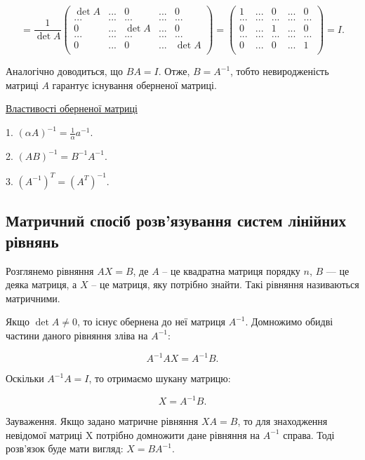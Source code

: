 $$= \dfrac{1}{\det A} \begin{pmatrix}
	\det A & ... & 0      & ... & 0      \\
	...    & ... & ...    & ... & ...    \\
	0      & ... & \det A & ... & 0      \\
	...    & ... & ...    & ... & ...    \\
	0      & ... & 0      & ... & \det A \\ 
\end{pmatrix}
= \begin{pmatrix}
	1      & ... & 0      & ... & 0      \\
	...    & ... & ...    & ... & ...    \\
	0      & ... & 1      & ... & 0      \\
	...    & ... & ...    & ... & ...    \\
	0      & ... & 0      & ... & 1      \\ 
\end{pmatrix}
= I.$$


Аналогічно доводиться, що $B A = I$. Отже, $B = A^{-1}$, тобто невиродженість
матриці $A$ гарантує існування оберненої матриці.


\underline{Властивості оберненої матриці}

1. $(\alpha A)^{-1} = \frac{1}{\alpha} a^{-1}$.

2. $(AB)^{-1} = B^{-1} A^{-1}$.

3. $(A^{-1})^T = (A^T)^{-1}$.

\subsection{Матричний спосіб розв’язування систем лінійних рівнянь}

Розглянемо рівняння $A X = B$, де $A$ -- це квадратна матриця порядку $n$, $B$ ---
це деяка матриця, а $X$ -- це матриця, яку потрібно знайти. Такі рівняння
називаються матричними.

Якщо $\det A \neq 0$, то існує обернена до неї матриця $A^{-1}$. Домножимо обидві
частини даного рівняння зліва на $A^{-1}$:

$$A^{-1} A X = A^{-1} B.$$

Оскільки $A^{-1} A = I$, то отримаємо шукану матрицю:

$$X = A^{-1} B.$$

Зауваження. Якщо задано матричне рівняння $X A = B$, то для знаходження
невідомої матриці X потрібно домножити дане рівняння на $A^{-1}$ справа. Тоді
розв’язок буде мати вигляд: $ X = B A^{-1}$.


